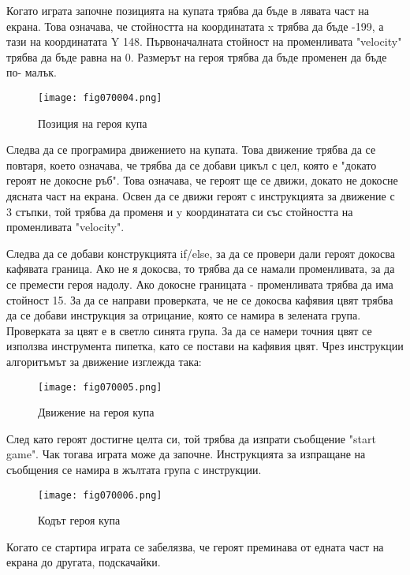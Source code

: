 Когато играта започне позицията на купата трябва да бъде в лявата част на екрана. Това означава, че стойността на координатата x трябва да бъде -199, а тази на координатата Y 148. Първоначалната стойност на променливата "velocity" трябва да бъде равна на 0. Размерът на героя трябва да бъде променен да бъде по- малък.

\begin{figure}[H]
  \centering
  \texttt{[image: fig070004.png]}
  \caption{Позиция на героя купа}
\label{fig070004}
\end{figure}

Следва да се програмира движението на купата. Това движение трябва да се повтаря, което означава, че трябва да се добави цикъл с цел, която е "докато героят не докосне ръб". Това означава, че героят ще се движи, докато не докосне дясната част на екрана. Освен да се движи героят с инструкцията за движение с 3 стъпки, той трябва да променя и y координатата си със стойността на променливата "velocity".

Следва да се добави конструкцията if/else, за да се провери дали героят докосва кафявата граница. Ако не я докосва, то трябва да се намали променливата, за да се премести героя надолу. Ако докосне границата - променливата трябва да има стойност 15. За да се направи проверката, че не се докосва кафявия цвят трябва да се добави инструкция за отрицание, която се намира в зелената група. Проверката за цвят е в светло синята група. За да се намери точния цвят се използва инструмента пипетка, като се постави на кафявия цвят. Чрез инструкции алгоритъмът за движение изглежда така:

\begin{figure}[H]
  \centering
  \texttt{[image: fig070005.png]}
  \caption{Движение на героя купа}
\label{fig070005}
\end{figure}

След като героят достигне целта си, той трябва да изпрати съобщение "start game". Чак тогава играта може да започне. Инструкцията за изпращане на съобщения се намира в жълтата група с инструкции.

\begin{figure}[H]
  \centering
  \texttt{[image: fig070006.png]}
  \caption{Кодът героя купа}
\label{fig070006}
\end{figure}

Когато се стартира играта се забелязва, че героят преминава от едната част на екрана до другата, подскачайки.

